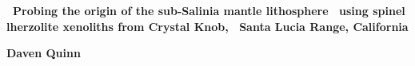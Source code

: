 \documentclass[letterpaper,12pt]{article}
\begin{document}
\begin{spacing}{0.8}\noindent\Gotham\Large\textbf{\
  Probing the origin of the sub-Salinia mantle lithosphere \
  using spinel lherzolite xenoliths from Crystal Knob, \
  Santa Lucia Range, California}\end{spacing}
{\noindent\GothamLight\normalsize\textbf{Daven Quinn}}\\

\begin{spacing}{1.2}

\end{spacing}




\pagebreak

\setcounter{secnumdepth}{-1}


\end{document}
